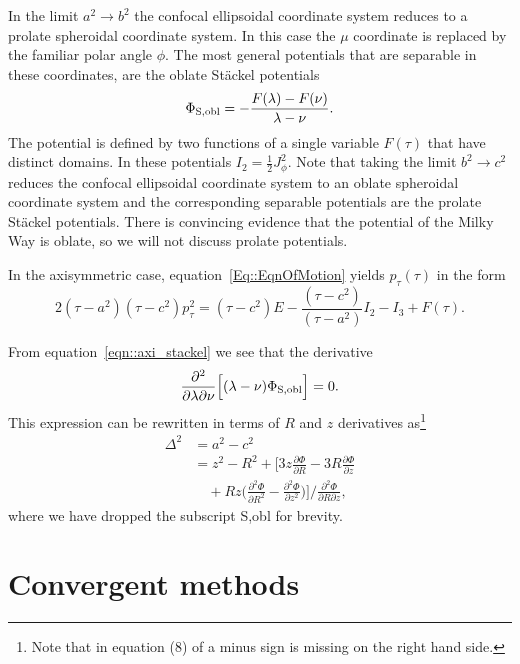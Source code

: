 \documentclass[useAMS,usenatbib,fleqn,a4paper]{mn2e}
\begin{document}
In the limit $a^2\rightarrow b^2$ the confocal ellipsoidal coordinate system
reduces to a prolate spheroidal coordinate system. In this case the $\mu$
coordinate is replaced by the familiar polar angle $\phi$. The most general
potentials that are separable  in these coordinates, are the oblate St\"ackel potentials
\begin{equation}
\Phi_{\rm S,obl} = -\frac{F(\lambda)-F(\nu)}{\lambda-\nu}.
\label{eqn::axi_stackel}
\end{equation}
 The potential is defined by two functions of a single variable $F(\tau)$
that have distinct domains. In these potentials $I_2=\frac{1}{2}J_\phi^2$.
Note that taking the limit $b^2 \rightarrow c^2$ reduces the confocal
ellipsoidal coordinate system to an oblate spheroidal coordinate
system and the corresponding separable potentials are the prolate St\"ackel
potentials. There is convincing evidence that the potential of the Milky Way
is oblate, so we will not discuss prolate potentials.

In the axisymmetric case, 
equation~\eqref{Eq::EqnOfMotion} yields $p_\tau(\tau)$ in the form
\begin{equation}
2(\tau-a^2)(\tau-c^2)p_\tau^2=(\tau-c^2)E-\frac{(\tau-c^2)}{(\tau-a^2)}I_2-I_3+F(\tau).
\label{Eq::EqnOfMotionAxi}
\end{equation}

From equation~\eqref{eqn::axi_stackel} we see that the derivative
\[
\frac{\partial^2}{\partial\lambda\partial\nu}\Big[(\lambda-\nu)\Phi_{\rm S,obl}\Big]=0.
\]
This expression can be rewritten in terms of $R$ and $z$ derivatives
as\footnote{Note that in equation (8) of \cite{Sanders2012a} a minus sign is
missing on the right hand side.}
\begin{equation}
\begin{split}
\Delta^2 &= a^2-c^2 \\
&= z^2-R^2+\Big[3z\frac{\partial \Phi}{\partial R}
-3R\frac{\partial \Phi}{\partial z}\\
&\quad+Rz\Big(\frac{\partial^2 \Phi}{\partial R^2}-\frac{\partial^2 \Phi}{\partial
z^2}\Big)\Big]\bigg/\frac{\partial^2 \Phi}{\partial R\partial z},
\end{split}
\label{DeltaGuess}
\end{equation}
where we have dropped the subscript S,obl for brevity.



\section{Convergent methods}\label{Sect::MethodsC}
\end{document}
